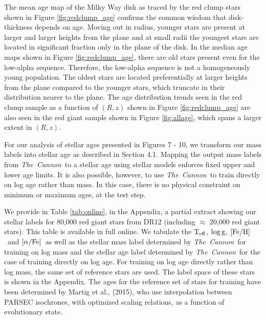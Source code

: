 \documentclass[12pt, preprint]{aastex}
\newcommand{\project}[1]{\textsl{#1}}
\newcommand{\tc}{\project{The~Cannon}}
\newcommand{\apogee}{\project{\textsc{apogee}}}
\newcommand{\teff}{\mbox{$\rm T_{eff}$}}
\newcommand{\feh}{\mbox{$\rm [Fe/H]$}}
\newcommand{\alphafe}{\mbox{$\rm [\alpha/Fe]$}}
\newcommand{\logg}{\mbox{$\rm \log g$}}
\begin{document}
The mean age map of the Milky Way disk as traced by the red clump stars shown in Figure \ref{fig:redclump_age} confirms the common wisdom that disk-thickness depends on age. Moving out in radius, younger stars are present at larger and larger heights from the plane and at small radii the youngest stars are located in significant fraction only in the plane of the disk. In the median age maps shown in Figure \ref{fig:redclump_age}, there are old stars present even for the low-alpha sequence. Therefore, the low-alpha sequence is not a homogeneously young population. The oldest stars are located preferentially at larger heights from the plane compared to the younger stars, which truncate in their distribution nearer to the plane. The age distribution trends seen in the red clump sample as a function of $(R,z)$ shown in Figure \ref{fig:redclump_age} are also seen in the red giant sample shown in Figure \ref{fig:allage}, which spans a larger extent in $(R,z)$. %

For our analysis of stellar ages presented in Figures 7 - 10, we transform our mass labels into stellar age as described in Section 4.1. Mapping the output mass labels from \tc\ to a stellar age using stellar models enforces fixed upper and lower age limits. It is also possible, however, to use \tc\ to train directly on log age rather than mass. In this case, there is no physical constraint on minimum or maximum ages, at the test step.  

We provide in Table \ref{tab:online}, in the Appendix,  a partial extract showing our stellar labels for 80,000 red giant stars from DR12 (including $\approx$ 20,000 red giant stars). This table is available in full online. We tabulate the \teff, \logg, \feh\ and \alphafe\ as well as the stellar mass label determined by \tc\ for training on log mass and  the stellar age label determined by \tc\ for the case of training directly on log age. For training on log age directly rather than log mass, the same set of reference stars are used. The label space of these stars is shown in the Appendix. The ages for the reference set of stars for training have been determined by Martig et al., (2015), who use interpolation between PARSEC isochrones, with optimized scaling relations, as a function of evolutionary state. 

\end{document}
